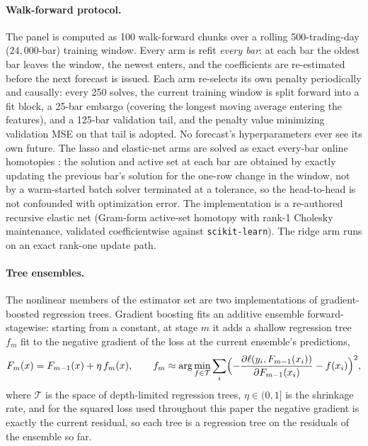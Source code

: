 \paragraph{Walk-forward protocol.}
The panel is computed as 100 walk-forward chunks over a rolling
500-trading-day ($24{,}000$-bar) training window. Every arm is refit
\emph{every bar}: at each bar the oldest bar leaves the window, the newest
enters, and the coefficients are re-estimated before the next forecast is
issued. Each arm re-selects its own penalty periodically and causally: every
250 solves, the current training window is split forward into a fit block, a
25-bar embargo (covering the longest moving average entering the features),
and a 125-bar validation tail, and the penalty value minimizing validation
MSE on that tail is adopted. No forecast's hyperparameters ever see its own
future. The lasso and elastic-net arms are solved as exact every-bar online
homotopies \citep{Garrigues2008}: the solution and active set at each bar
are obtained by exactly updating the previous bar's solution for the
one-row change in the window, not by a warm-started batch solver
terminated at a tolerance, so the head-to-head is not confounded with
optimization error. The implementation is a re-authored recursive elastic
net (Gram-form active-set homotopy with rank-1 Cholesky maintenance,
validated coefficientwise against \texttt{scikit-learn}). The ridge arm
runs on an exact rank-one update path.

\paragraph{Tree ensembles.} The nonlinear members of the estimator set
are two implementations of gradient-boosted regression trees. Gradient
boosting fits an additive ensemble forward-stagewise: starting from a
constant, at stage $m$ it adds a shallow regression tree $f_m$ fit to the
negative gradient of the loss at the current ensemble's predictions,
\begin{equation*}
    F_m(x) = F_{m-1}(x) + \eta\, f_m(x),
    \qquad
    f_m \approx \arg\min_{f \in \mathcal{T}}
      \sum_{i} \Bigl( -\frac{\partial \ell(y_i, F_{m-1}(x_i))}
                            {\partial F_{m-1}(x_i)} - f(x_i) \Bigr)^2,
\end{equation*}
where $\mathcal{T}$ is the space of depth-limited regression trees,
$\eta \in (0, 1]$ is the shrinkage rate, and for the squared loss used
throughout this paper the negative gradient is exactly the current
residual, so each tree is a regression tree on the residuals of the
ensemble so far.

